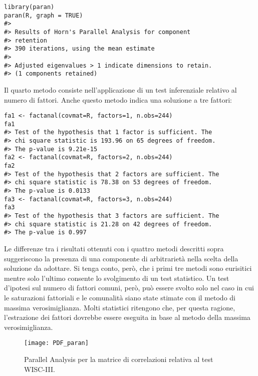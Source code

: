 \begin{exmp}
\begin{lstlisting}
library(paran)
paran(R, graph = TRUE)
#> 
#> Results of Horn's Parallel Analysis for component 
#> retention 
#> 390 iterations, using the mean estimate
#> 
#> Adjusted eigenvalues > 1 indicate dimensions to retain.
#> (1 components retained)
\end{lstlisting}

Il quarto metodo consiste nell'applicazione di un test inferenziale relativo al numero di fattori.  Anche questo metodo indica una soluzione a tre fattori:

\begin{lstlisting}
fa1 <- factanal(covmat=R, factors=1, n.obs=244)
fa1
#> Test of the hypothesis that 1 factor is sufficient. The
#> chi square statistic is 193.96 on 65 degrees of freedom.
#> The p-value is 9.21e-15 
fa2 <- factanal(covmat=R, factors=2, n.obs=244)
fa2
#> Test of the hypothesis that 2 factors are sufficient. The 
#> chi square statistic is 78.38 on 53 degrees of freedom.
#> The p-value is 0.0133 
fa3 <- factanal(covmat=R, factors=3, n.obs=244)
fa3
#> Test of the hypothesis that 3 factors are sufficient. The 
#> chi square statistic is 21.28 on 42 degrees of freedom.
#> The p-value is 0.997 
\end{lstlisting}

Le differenze tra i risultati ottenuti con i quattro metodi descritti
sopra suggeriscono la presenza di una componente di arbitrarietà nella
scelta della soluzione da adottare.   Si tenga conto, però, che i primi
tre metodi sono eurisitici mentre solo l'ultimo consente lo
svolgimento di un test statistico. Un test d'ipotesi sul numero di
fattori comuni, però, può essere svolto solo nel caso in cui le
saturazioni fattoriali e le comunalità siano state stimate con il
metodo di massima verosimiglianza. Molti statistici ritengono che, per
questa ragione, l'estrazione dei fattori dovrebbe essere eseguita in
base al metodo della massima verosimiglianza.

\end{exmp}


\begin{figure}[h!]
\centering
    \texttt{[image: PDF\_paran]}
    \caption{Parallel Analysis per la matrice di correlazioni relativa al test WISC-III.}
  \label{fig:paran}
\end{figure}
